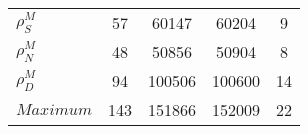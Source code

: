 \begin{center}
\begin{longtable}{lcccc}
$ {\rho^{M}_{S}}       $	 & 	                   57	 & 	                60147	 & 	                60204	 & 	                    9 \\ 
$ {\rho^{M}_{N}}       $	 & 	                   48	 & 	                50856	 & 	                50904	 & 	                    8 \\ 
$ {\rho^{M}_{D}}       $	 & 	                   94	 & 	               100506	 & 	               100600	 & 	                   14 \\ 
$Maximum               $	 & 	                  143	 & 	               151866	 & 	               152009	 & 	                   22 \\ 
\end{longtable}
 \end{center}
